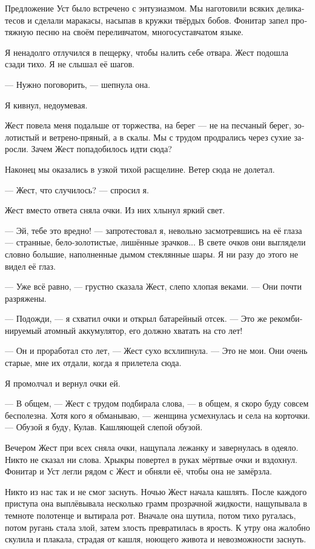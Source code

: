 \documentclass[a4paper,10pt,fleqn]{book}\usepackage{polyglossia}\setdefaultlanguage[babelshorthands=true]{russian}\setotherlanguage{english}\defaultfontfeatures{Ligatures=TeX,Mapping=tex-text}
\newcommand{\asterism}{\vspace{1em}{\centering\Large\bfseries$\ast~\ast~\ast$\par}\vspace{1em}}
\begin{document}
Предложение Уст было встречено с энтузиазмом.
Мы наготовили всяких деликатесов и сделали маракасы, насыпав в кружки твёрдых бобов.
Фонитар запел протяжную песню на своём переливчатом, многосуставчатом языке.


Я ненадолго отлучился в пещерку, чтобы налить себе отвара.
Жест подошла сзади тихо.
Я не слышал её шагов.

--- Нужно поговорить, --- шепнула она.

Я кивнул, недоумевая.

Жест повела меня подальше от торжества, на берег --- не на песчаный берег, золотистый и ветрено-пряный, а в скалы.
Мы с трудом продрались через сухие заросли.
Зачем Жест попадобилось идти сюда?

Наконец мы оказались в узкой тихой расщелине.
Ветер сюда не долетал.

--- Жест, что случилось? --- спросил я.

Жест вместо ответа сняла очки.
Из них хлынул яркий свет.

--- Эй, тебе это вредно! --- запротестовал я, невольно засмотревшись на её глаза --- странные, бело-золотистые, лишённые зрачков...
В свете очков они выглядели словно большие, наполненные дымом стеклянные шары.
Я ни разу до этого не видел её глаз.

--- Уже всё равно, --- грустно сказала Жест, слепо хлопая веками.
--- Они почти разряжены.

--- Подожди, --- я схватил очки и открыл батарейный отсек.
--- Это же рекомбинируемый атомный аккумулятор, его должно хватать на сто лет!

--- Он и проработал сто лет, --- Жест сухо всхлипнула.
--- Это не мои.
Они очень старые, мне их отдали, когда я прилетела сюда.

Я промолчал и вернул очки ей.

--- В общем, --- Жест с трудом подбирала слова, --- в общем, я скоро буду совсем бесполезна.
Хотя кого я обманываю, --- женщина усмехнулась и села на корточки.
--- Обузой я буду, Кулав.
Кашляющей слепой обузой.

\asterism

Вечером Жест при всех сняла очки, нащупала лежанку и завернулась в одеяло.
Никто не сказал ни слова.
Хрыкры повертел в руках мёртвые очки и вздохнул.
Фонитар и Уст легли рядом с Жест и обняли её, чтобы она не замёрзла.

Никто из нас так и не смог заснуть.
Ночью Жест начала кашлять.
После каждого приступа она выплёвывала несколько грамм прозрачной жидкости, нащупывала в темноте полотенце и вытирала рот.
Вначале она шутила, потом тихо ругалась, потом ругань стала злой, затем злость превратилась в ярость.
К утру она жалобно скулила и плакала, страдая от кашля, ноющего живота и невозможности заснуть.
\end{document}
